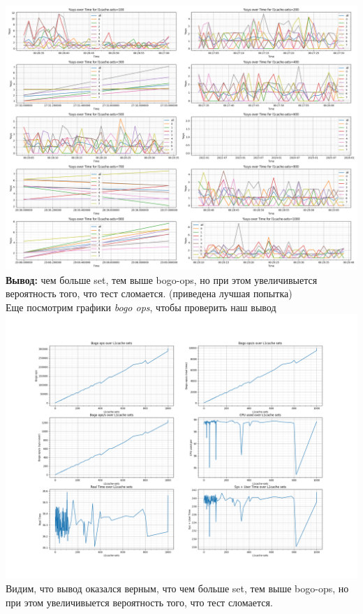 \includegraphics[width=\textwidth]{./cache/image/l1cache-sets-sys-cpu-2.png}
\textbf{Вывод:} чем больше set, тем выше bogo-ops, но при этом увеличивыется вероятность того, что тест сломается. (приведена лучшая попытка)\\
Еще посмотрим графики \textit{bogo ops}, чтобы проверить наш вывод\\
\includegraphics[width=\textwidth]{./cache/image/l1cache-sets-bogops.png}
Видим, что вывод оказался верным, что чем больше set, тем выше bogo-ops, но при этом увеличивыется вероятность того, что тест сломается.
